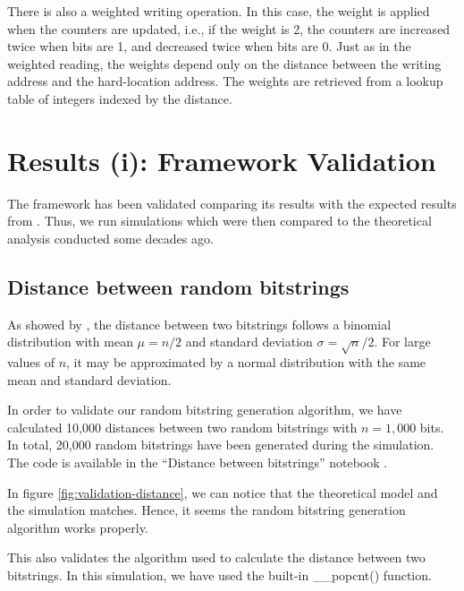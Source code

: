 There is also a weighted writing operation. In this case, the weight is applied when the counters are updated, i.e., if the weight is 2, the counters are increased twice when bits are 1, and decreased twice when bits are 0. Just as in the weighted reading, the weights depend only on the distance between the writing address and the hard-location address. The weights are retrieved from a lookup table of integers indexed by the distance.


\chapter{Results (i): Framework Validation}

The framework has been validated comparing its results with the expected results from \citet{Kanerva1988}. Thus, we run simulations which were then compared to the theoretical analysis conducted some decades ago.

\section{Distance between random bitstrings}

As showed by \citet{Kanerva1988}, the distance between two bitstrings follows a binomial distribution with mean $\mu = n/2$ and standard deviation $\sigma = \sqrt{n}/2$. For large values of $n$, it may be approximated by a normal distribution with the same mean and standard deviation.

In order to validate our random bitstring generation algorithm, we have calculated 10,000 distances between two random bitstrings with $n=1,000$ bits. In total, 20,000 random bitstrings have been generated during the simulation. The code is available in the ``Distance between bitstrings'' notebook \citep{sdmframework}.

In figure \ref{fig:validation-distance}, we can notice that the theoretical model and the simulation matches. Hence, it seems the random bitstring generation algorithm works properly.

This also validates the algorithm used to calculate the distance between two bitstrings. In this simulation, we have used the built-in \_\_popcnt() function.

